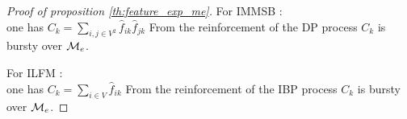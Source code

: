 \begin{proof}[Proof of proposition \ref{th:feature_exp_me}]

For IMMSB : ~\\

one has $C_k = \sum_{i,j \in V^2} \hat f_{ik} \hat f_{jk}$
From the reinforcement of the DP process $C_k$ is bursty over $\mathcal{M}_e$.

For ILFM : ~\\

one has $C_k = \sum_{i \in V} \hat f_{ik}$
From the reinforcement of the IBP process $C_k$ is bursty over $\mathcal{M}_e$.
\end{proof}




